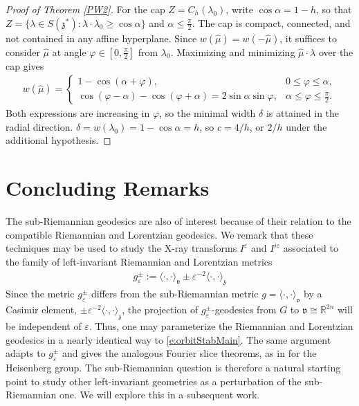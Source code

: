 \documentclass[11pt]{amsart}
\theoremstyle{plain}
\theoremstyle{definition}
\theoremstyle{remark}
\numberwithin{equation}{section}
\def\fz{\mathfrak{z}}
\def\fv{\mathfrak{v}}
\def\eps{\varepsilon}
\def\R{{\mathbb R}}%
\numberwithin{equation}{section}
\begin{document}
\begin{proof}[Proof of Theorem \ref{PW2}]
	For the cap $Z=C_h(\lambda_0)$, write $\cos\alpha=1-h$, so that $Z=\{\lambda\in S(\fz^*): \lambda\cdot\lambda_0\geq\cos\alpha\}$ and $\alpha\leq\tfrac{\pi}{2}$. The cap is compact, connected, and not contained in any affine hyperplane. Since $w(\hat\mu)=w(-\hat\mu)$, it suffices to consider $\hat\mu$ at angle $\varphi\in [0, \tfrac{\pi}{2}]$ from $\lambda_0$. Maximizing and minimizing $\hat\mu\cdot\lambda$ over the cap gives
	\begin{align*}
		w(\hat\mu)=
		\begin{cases}
			1-\cos(\alpha+\varphi), & 0\leq \varphi\leq \alpha,\\
			\cos(\varphi-\alpha)-\cos(\varphi+\alpha)=2\sin\alpha\sin\varphi, & \alpha\leq \varphi\leq \tfrac{\pi}{2}.
		\end{cases}
	\end{align*}
	Both expressions are increasing in $\varphi$, so the minimal width $\delta$ is attained in the radial direction. $\delta=w(\lambda_0)=1-\cos\alpha=h$, so $c=4/h$, or $2/h$ under the additional hypothesis.
\end{proof}

\section{Concluding Remarks}\label{s:concluding}
The sub-Riemannian geodesics are also of interest because of their relation to  the compatible Riemannian and Lorentzian geodesics. We remark that these techniques may be used to study the X-ray transforms $I^\eps$ and $I^{i\eps}$ associated to the family of left-invariant Riemannian and Lorentzian metrics
\begin{align*}
	g_\eps^\pm:=\langle\cdot, \cdot\rangle_\fv\pm \eps^{-2}\langle \cdot, \cdot \rangle_\fz
\end{align*}
Since the metric $g_\eps^\pm$ differs from the sub-Riemannian metric $g=\langle \cdot, \cdot\rangle_{\fv}$ by a Casimir element, $\pm\eps^{-2}\langle\cdot,\cdot\rangle_\fz$, the projection of $g^{\pm}_\eps$-geodesics from $G$ to $\fv\cong \R^{2n}$ will be independent of $\eps$. Thus, one may parameterize the Riemannian and Lorentzian geodesics in a nearly identical way to \eqref{e:orbitStabMain}.
The same argument adapts to $g_\eps^\pm$ and gives the analogous Fourier slice theorems, as in \cite{flynnInjectivityHeisenbergXray2021} for the Heisenberg group. The sub-Riemannian question is therefore a natural starting point to study other left-invariant geometries as a perturbation of the sub-Riemannian one. We will explore this in a subsequent work. 
\end{document}
